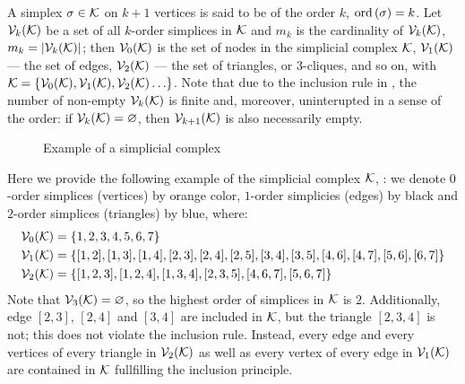 A simplex \( \sigma \in \mathcal{K} \) on \( k + 1 \) vertices is said to be of the order \( k \), \( \mathrm{ord}\,(\sigma) = k \). Let \( \mathcal{V}_{k}(\mathcal{K}) \) be a set of all \(k\)-order simplices in \( \mathcal{K} \) and \( m_k \) is the cardinality of \( \mathcal{V}_{k}(\mathcal{K})\), \( m_k = | \mathcal{V}_{k}(\mathcal{K}) | \); then \( \mathcal{V}_{0}(\mathcal{K}) \) is the set of nodes in the simplicial complex \( \mathcal{K} \), \( \mathcal{V}_{1}(\mathcal{K}) \) --- the set of edges, \( \mathcal{V}_{2}(\mathcal{K}) \) --- the set of triangles, or \(3\)-cliques, and so on, with \( \mathcal{K} = \{ \mathcal{V}_{0}(\mathcal{K}), \mathcal{V}_{1}(\mathcal{K}), \mathcal{V}_{2}(\mathcal{K}) \ldots \} \). Note that due to the inclusion rule in , the number of non-empty \( \mathcal{V}_{k}(\mathcal{K}) \) is finite and, moreover, uninterupted in a sense of the order: if \( \mathcal{V}_{k}(\mathcal{K}) = \varnothing \), then \( \mathcal{V}_{k+1}(\mathcal{K}) \) is also necessarily empty.
\begin{figure}[hbtp]
      \centering
      \scalebox{1.5}{}
      \caption{
            Example of a simplicial complex\label{fig:example_SC}}
\end{figure}


\begin{example}

      Here we provide the following example of the simplicial complex \( \mathcal{K} \), : we denote \(0\)-order simplices (vertices) by orange color, \( 1\)-order simplicies (edges) by black and \( 2\)-order simplices (triangles) by blue, where: 
      \begin{equation}
            \begin{aligned}
                  \mathcal{V}_{0}(\mathcal{K}) & = \{ 1, 2, 3, 4, 5, 6, 7 \} \\
                  \mathcal{V}_{1}(\mathcal{K}) & = \{ [1, 2], [1, 3], [1, 4], [2, 3], [2, 4], [2, 5], [3, 4], [3, 5], [4, 6], [4, 7], [5, 6], [6, 7] \} \\
                  \mathcal{V}_{2}(\mathcal{K}) & = \{ [ 1, 2, 3 ], [1, 2, 4], [1, 3, 4], [2, 3, 5], [4, 6, 7], [5, 6, 7] \}
            \end{aligned}
      \end{equation}
      Note that \( \mathcal{V}_{3}(\mathcal{K}) = \varnothing \), so the highest order of simplices in \( \mathcal{K} \) is \( 2 \). Additionally, edge \( [2, 3] \), \( [2, 4]\) and \( [3, 4]\) are included in \( \mathcal{K} \), but the triangle \( [2, 3, 4]\) is not; this does not violate the inclusion rule. Instead, every edge and every vertices of every triangle in \( \mathcal{V}_{2}(\mathcal{K}) \) as well as every vertex of every edge in \( \mathcal{V}_{1}(\mathcal{K}) \) are contained in \( \mathcal{K} \) fullfilling the inclusion principle.
\end{example}

\begin{example}

      
\end{example}


